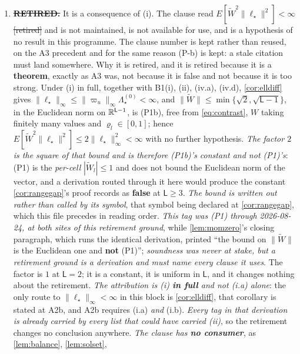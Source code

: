 \begin{enumerate}
\item[(ii)] \textbf{\sout{RETIRED.}} It is a consequence of \textup{(i)}.
The clause read
$E[\widetilde W^{2}\|\ell_\star\|^{2}]<\infty$ \sout{[retired]} and is not maintained, is not
available for use, and is a hypothesis of no result in this programme. The clause number is kept
rather than reused, on the A3 precedent and for the same reason \textup{(P-b)} is kept: a stale
citation must land somewhere.
Why it is retired, and it is retired because it is a \textbf{theorem}, exactly as A3 was, not
because it is false and not because it is too strong. Under (i) in full, together with B1(i), (ii),
(iv.a), (iv.d), \cref{cor:elldiff} gives $\|\ell_\star\|_\infty\le\|\varpi_u\|_\infty\Lambda^{(0)}_\star<\infty$,
and $\|\widetilde W\|\le\min\{\sqrt2,\sqrt{\mathsf L-1}\}$, in the Euclidean norm on
$\mathbb{R}^{\mathsf L-1}$, is \textup{(P1b)}, free from \eqref{eq:contrast}, $W$ taking finitely many values and
$\varrho_l\in[0,1]$; hence
$E[\widetilde W^{2}\|\ell_\star\|^{2}]\le2\|\ell_\star\|_\infty^{2}<\infty$ with no further hypothesis.
\emph{The factor $2$ is the square of that bound and is therefore \textup{(P1b)}'s constant and not
\textup{(P1)}'s}: \textup{(P1)} is the
\emph{per-cell} $|\widetilde W_l|\le1$ and does not bound the Euclidean norm of the vector, and a
derivation routed through it here would produce the constant \cref{cor:rangegap}'s proof records as
\textbf{false} at $\mathsf L\ge3$. \emph{The bound is written out rather than called by its symbol},
that symbol being declared at \cref{cor:rangegap}, which this file precedes in reading order.
\emph{This tag was \textup{(P1)} through 2026-08-24, at both sites of
this retirement ground}, while \cref{lem:momzero}'s closing paragraph, which runs the identical
derivation, printed ``the bound on $\|\widetilde W\|$ is the Euclidean one and \textbf{not}
\textup{(P1)}''; \emph{soundness was never at stake, but a retirement ground is a derivation and must
name every clause it uses}. The factor is $1$ at
$\mathsf L=2$; it is a constant, it is uniform in $\mathsf L$, and it changes nothing about the
retirement.
\emph{The attribution is (i) \textbf{in full} and not (i.a) alone}: the only route to
$\|\ell_\star\|_\infty<\infty$ in this block is \cref{cor:elldiff}, that corollary is stated at A2b, and
A2b requires (i.a) \emph{and} (i.b). \emph{Every tag in that derivation is already carried by every list
that could have carried (ii)}, so the retirement changes no conclusion anywhere.
\emph{The clause has \textbf{no consumer}}, as \cref{lem:balance}, \cref{lem:solset},

\end{enumerate}

